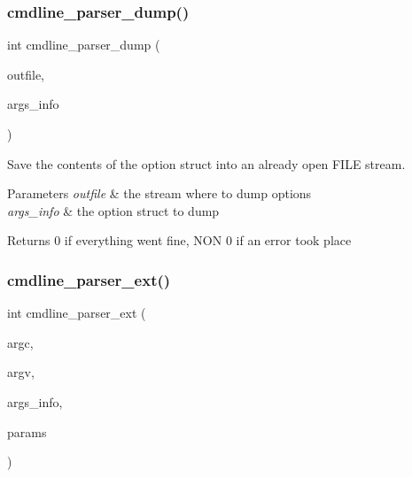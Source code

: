 \subsubsection{\texorpdfstring{cmdline\+\_\+parser\+\_\+dump()}{cmdline\_parser\_dump()}}
{\footnotesize\ttfamily int cmdline\+\_\+parser\+\_\+dump (\begin{DoxyParamCaption}\item[{F\+I\+LE $\ast$}]{outfile,  }\item[{struct \hyperlink{structgengetopt__args__info}{gengetopt\+\_\+args\+\_\+info} $\ast$}]{args\+\_\+info }\end{DoxyParamCaption})}

Save the contents of the option struct into an already open F\+I\+LE stream. 
\begin{DoxyParams}{Parameters}
{\em outfile} & the stream where to dump options \\
\hline
{\em args\+\_\+info} & the option struct to dump \\
\hline
\end{DoxyParams}
\begin{DoxyReturn}{Returns}
0 if everything went fine, N\+ON 0 if an error took place 
\end{DoxyReturn}
\mbox{\label{des-getopt_8h_ac7bb5d76f3f56d1c0b3b531f11ac6f07}} 
\subsubsection{\texorpdfstring{cmdline\+\_\+parser\+\_\+ext()}{cmdline\_parser\_ext()}}
{\footnotesize\ttfamily int cmdline\+\_\+parser\+\_\+ext (\begin{DoxyParamCaption}\item[{int}]{argc,  }\item[{char $\ast$$\ast$}]{argv,  }\item[{struct \hyperlink{structgengetopt__args__info}{gengetopt\+\_\+args\+\_\+info} $\ast$}]{args\+\_\+info,  }\item[{struct \hyperlink{structcmdline__parser__params}{cmdline\+\_\+parser\+\_\+params} $\ast$}]{params }\end{DoxyParamCaption})}


